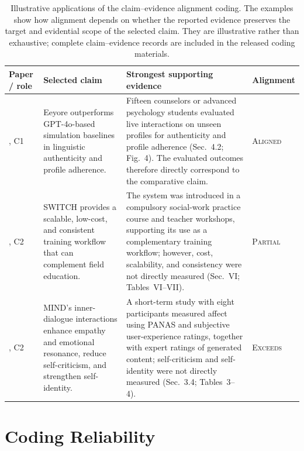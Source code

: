 \begin{table}[p]
\centering
\small
\begin{tabular}{p{2.4cm}p{4.2cm}p{5.8cm}p{1.9cm}}
\toprule
\textbf{Paper / role} &
\textbf{Selected claim} &
\textbf{Strongest supporting evidence} &
\textbf{Alignment} \\
\midrule

\citealp{Liu2025Eeyore}, C1
&
Eeyore outperforms GPT-4o-based simulation baselines in linguistic
authenticity and profile adherence.
&
Fifteen counselors or advanced psychology students evaluated live
interactions on unseen profiles for authenticity and profile adherence
(Sec.~4.2; Fig.~4). The evaluated outcomes therefore directly correspond
to the comparative claim.
&
\textsc{Aligned}
\\
\midrule

\citealp{Sungarda2025GenAI}, C2
&
SWITCH provides a scalable, low-cost, and consistent training workflow
that can complement field education.
&
The system was introduced in a compulsory social-work practice course
and teacher workshops, supporting its use as a complementary training
workflow; however, cost, scalability, and consistency were not directly
measured (Sec.~VI; Tables~VI--VII).
&
\textsc{Partial}
\\
\midrule

\citealp{Chen2025MIND}, C2
&
MIND's inner-dialogue interactions enhance empathy and emotional resonance,
reduce self-criticism, and strengthen self-identity.
&
A short-term study with eight participants measured affect using PANAS
and subjective user-experience ratings, together with expert ratings of
generated content; self-criticism and self-identity were not directly
measured (Sec.~3.4; Tables~3--4).
&
\textsc{Exceeds}
\\

\bottomrule
\end{tabular}
\caption{Illustrative applications of the claim--evidence alignment coding.
The examples show how alignment depends on whether the reported evidence
preserves the target and evidential scope of the selected claim. They are
illustrative rather than exhaustive; complete claim--evidence records are
included in the released coding materials.}
\label{tab:claim-evidence-examples}
\end{table}

\section{Coding Reliability}
\label{app:reliability}

